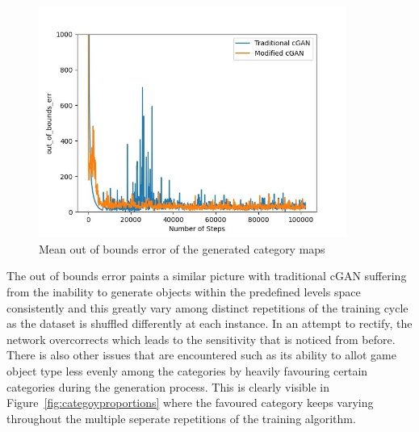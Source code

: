 \documentclass{Configuration_Files/PoliMi3i_thesis}
\begin{document}
\begin{figure}[H]
    \centering
    \includegraphics[width=0.9\textwidth]{oob_err.jpg}
    \caption{Mean out of bounds error of the generated category maps}
    \label{fig:ooberror}
\end{figure}
The out of bounds error paints a similar picture with traditional cGAN suffering from 
the inability to generate objects within the predefined levels space consistently and 
this greatly vary among distinct repetitions of the training cycle as the dataset is 
shuffled differently at each instance. In an attempt to rectify, the network 
overcorrects which leads to the sensitivity that is noticed from before. There is also 
other issues that are encountered such as its ability to allot game object type less
evenly among the categories by heavily favouring certain categories during the 
generation process. This is clearly visible in Figure~\ref{fig:categoyproportions} where the favoured category 
keeps varying throughout the multiple seperate repetitions of the training algorithm.
\newpage
\end{document}
